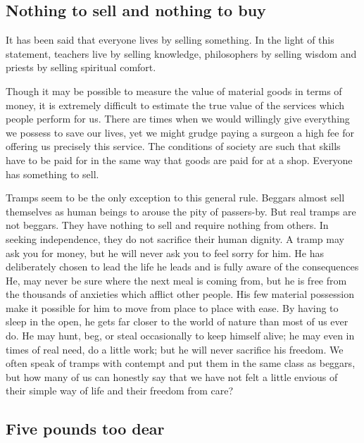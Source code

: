 \documentclass[11pt]{article}
\begin{document}
\subsection{Nothing to sell and nothing to buy}
\label{sec-1-27}

It has been said that everyone lives by selling something. In the light of this statement, teachers live by selling knowledge, philosophers by selling wisdom and priests by selling spiritual comfort.

Though it may be possible to measure the value of material goods in terms of money, it is extremely difficult to estimate the true value of the services which people perform for us. There are times when we would willingly give everything we possess to save our lives, yet we might grudge paying a surgeon a high fee for offering us precisely this service. The conditions of society are such that skills have to be paid for in the same way that goods are paid for at a shop. Everyone has something to sell.

Tramps seem to be the only exception to this general rule. Beggars almost sell themselves as human beings to arouse the pity of passers-by. But real tramps are not beggars. They have nothing to sell and require nothing from others. In seeking independence, they do not sacrifice their human dignity. A tramp may ask you for money, but he will never ask you to feel sorry for him. He has deliberately chosen to lead the life he leads and is fully aware of the consequences He, may never be sure where the next meal is coming from, but he is free from the thousands of anxieties which afflict other people. His few material possession make it possible for him to move from place to place with ease. By having to sleep in the open, he gets far closer to the world of nature than most of us ever do. He may hunt, beg, or steal occasionally to keep himself alive; he may even in times of real need, do a little work; but he will never sacrifice his freedom. We often speak of tramps with contempt and put them in the same class as beggars, but how many of us can honestly say that we have not felt a little envious of their simple way of life and their freedom from care?
\subsection{Five pounds too dear}
\label{sec-1-28}
\end{document}
